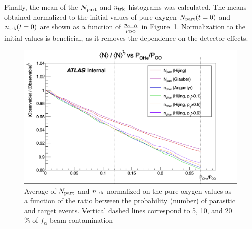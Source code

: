 Finally, the mean of the $N_{\text{part}}$ and $n_\text{trk}$ histograms was calculated. The means obtained normalized to the initial values of pure oxygen $N_{\text{part}}(t=0)$ and $n_\text{trk}(t=0)$ are shown as a function of $\frac{p_{\mathrm{\Oa}}}{p_{\mathrm{OO}}}$ in Figure~\ref{fig:corr_norm}. Normalization to the initial values is beneficial, as it removes the dependence on the detector effects. 

\begin{figure}[h]
    \centering    
    \includegraphics[width=\linewidth]{images/mixing_scan_all_observables.png}
    \caption{Average of $N_{\text{part}}$ and $n_\text{trk}$ normalized on the pure oxygen values as a function of the ratio between the probability (number) of parasitic and target events. Vertical dashed lines correspond to 5, 10, and 20 \% of $f_{\mathrm{\alpha}}$ beam contamination}
    \label{fig:corr_norm}
\end{figure}

